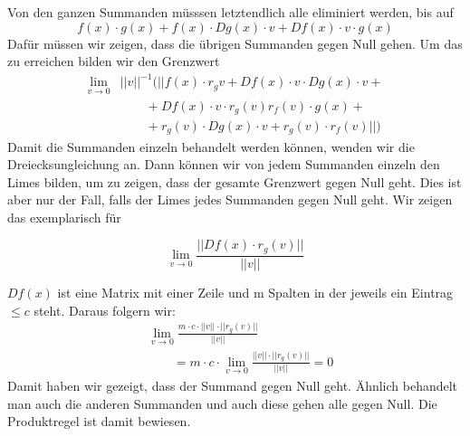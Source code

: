 Von den ganzen Summanden müsssen letztendlich alle eliminiert werden, bis auf 
\begin{equation*} f(x) \cdot g(x) + f(x) \cdot Dg(x) \cdot v + Df(x) \cdot v \cdot g(x) \end{equation*} 
Dafür müssen wir zeigen, dass die übrigen Summanden gegen Null gehen. Um das zu erreichen bilden wir den Grenzwert
\begin{align*}
\lim \limits_{v \rightarrow 0} &||v||^{-1}(||f(x) \cdot r_{g}v + Df(x) \cdot v \cdot Dg(x) \cdot v +{}\\
&\qquad + Df(x) \cdot v \cdot r_{g}(v) r_{f}(v) \cdot g(x) +{}\\
&\qquad + r_{g}(v) \cdot Dg(x) \cdot v + r_{g}(v) \cdot r_{f}(v)||)
\end{align*}
Damit die Summanden einzeln behandelt werden können, wenden wir die Dreiecksungleichung an. Dann können wir von jedem Summanden einzeln den Limes bilden, um zu zeigen, dass der gesamte Grenzwert gegen Null geht. Dies ist aber nur der Fall, falls der Limes jedes Summanden gegen Null geht. Wir zeigen das exemplarisch für 

\begin{equation*}
\lim\limits_{v \rightarrow 0} \frac{||Df(x) \cdot r_{g}(v)||}{||v||}
\end{equation*}

$Df(x)$ ist eine Matrix mit einer Zeile und m Spalten in der jeweils ein Eintrag $\leq c$ steht. Daraus folgern wir:
\begin{align*}
&\lim\limits_{v \rightarrow 0} \frac{m \cdot c \cdot ||v|| \cdot ||r_{g}(v)||}{||v||}\\
&\qquad= m \cdot c \cdot \lim\limits_{v \rightarrow 0} \frac{ ||v|| \cdot ||r_{g}(v)||}{||v||} = 0
\end{align*} 
Damit haben wir gezeigt, dass der Summand gegen Null geht. Ähnlich behandelt man auch die anderen Summanden und auch diese gehen alle gegen Null.
Die Produktregel ist damit bewiesen. 













